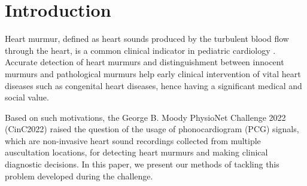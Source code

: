 \section{Introduction}
\label{sec:intro}

Heart murmur, defined as heart sounds produced by the turbulent blood flow through the heart, is a common clinical indicator in pediatric cardiology \cite{Masic_2018}. Accurate detection of heart murmurs and distinguishment between innocent murmurs and pathological murmurs help early clinical intervention of vital heart diseases such as congenital heart diseases, hence having a significant medical and social value.

Based on such motivations, the George B. Moody PhysioNet Challenge 2022 (CinC2022) \cite{goldberger2000physionet,cinc2022} raised the question of the usage of phonocardiogram (PCG) signals, which are non-invasive heart sound recordings collected from multiple auscultation locations, for detecting heart murmurs and making clinical diagnostic decisions. In this paper, we present our methods of tackling this problem developed during the challenge.
